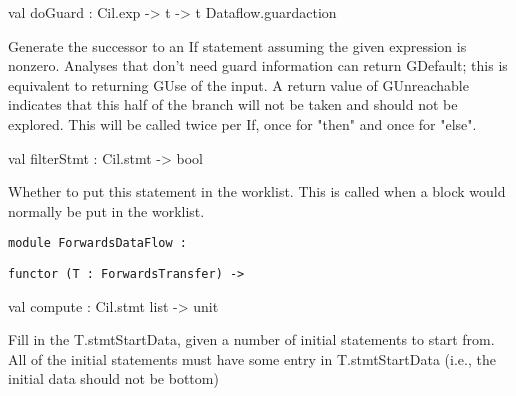 \documentclass[11pt]{article}
\begin{document}
\begin{ocamldocsigend}
\begin{ocamldocdescription}
\end{ocamldocdescription}


\label{val:Dataflow.ForwardsTransfer.doGuard}\begin{ocamldoccode}
val doGuard : Cil.exp ->
  t ->
  t Dataflow.guardaction
\end{ocamldoccode}
\begin{ocamldocdescription}
Generate the successor to an If statement assuming the given expression
 is nonzero.  Analyses that don't need guard information can return 
 GDefault; this is equivalent to returning GUse of the input.
 A return value of GUnreachable indicates that this half of the branch
 will not be taken and should not be explored.  This will be called
 twice per If, once for "then" and once for "else".


\end{ocamldocdescription}


\label{val:Dataflow.ForwardsTransfer.filterStmt}\begin{ocamldoccode}
val filterStmt : Cil.stmt -> bool
\end{ocamldoccode}
\begin{ocamldocdescription}
Whether to put this statement in the worklist. This is called when a 
 block would normally be put in the worklist.


\end{ocamldocdescription}
\end{ocamldocsigend}






\begin{ocamldoccode}
{\tt{module }}{\tt{ForwardsDataFlow}}{\tt{ : }}\end{ocamldoccode}
\label{module:Dataflow.ForwardsDataFlow}

{\tt{functor (}}{\tt{T}}{\tt{ : }}{\tt{ForwardsTransfer}}{\tt{) -> }}\begin{ocamldocsigend}


\label{val:Dataflow.ForwardsDataFlow.compute}\begin{ocamldoccode}
val compute : Cil.stmt list -> unit
\end{ocamldoccode}
\begin{ocamldocdescription}
Fill in the T.stmtStartData, given a number of initial statements to 
 start from. All of the initial statements must have some entry in 
 T.stmtStartData (i.e., the initial data should not be bottom)


\end{ocamldocdescription}
\end{ocamldocsigend}
\end{document}
